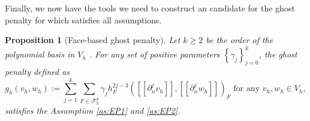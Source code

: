 \documentclass[11pt]{article}
\newtheorem{proposition}[theorem]{Proposition}
\theoremstyle{remark}
\newcommand{\jump}[1]{\left[\!\left[ #1 \right]\!\right]}
\renewcommand{\ge}{\geqslant}
\numberwithin{equation}{section}
\begin{document}
Finally, we now have the tools we need to construct an candidate for the ghost penalty for which satisfies all assumptions.

\begin{proposition}[Face-based ghost penalty]
    Let $k\ge  2$ be the order of the polynomial basis in $V_{h}$ .
    For any set of positive parameters $\left\{ \gamma _{j} \right\} _{j=0}^{k}$, the ghost penalty defined as
    \begin{equation}
        \label{eq:ghost_penalty}
    g^{}_{h}( v_{h},w_{h})  := \sum_{j=1}^{k} \sum_{F \in \mathcal{F} _{h}^{g}}^{} \gamma _{j} h^{2j-3}_{F} ( \jump{ \partial ^{j}_{n} v_{h} }, \jump{ \partial ^{j}_{n} w_{h} }  ) _{F} \text{ for any } v_{h},w_{h} \in V_{h},
    \end{equation}
    satisfies the Assumption \ref{as:EP1} and \ref{as:EP2}.
\end{proposition}
\end{document}
